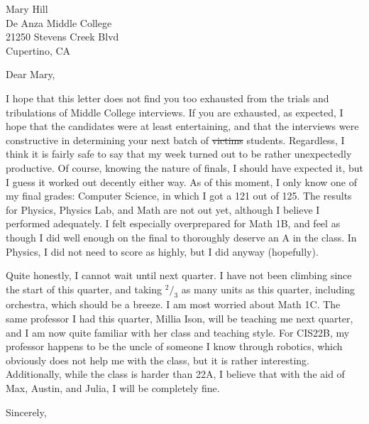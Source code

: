 \documentclass[a4paper]{letter}
\begin{document}
\begin{letter}{Mary Hill \\ De Anza Middle College \\ 21250 Stevens Creek Blvd \\ Cupertino, CA}
    \opening{Dear Mary,}
    I hope that this letter does not find you too exhausted from the trials and tribulations of Middle College interviews. If you are exhausted, as expected, I hope that the candidates were at least entertaining, and that the interviews were constructive in determining your next batch of \sout{victims} students. Regardless, I think it is fairly safe to say that my week turned out to be rather unexpectedly productive. Of course, knowing the nature of finals, I should have expected it, but I guess it worked out decently either way. As of this moment, I only know one of my final grades: Computer Science, in which I got a 121 out of 125. The results for Physics, Physics Lab, and Math are not out yet, although I believe I performed adequately. I felt especially overprepared for Math 1B, and feel as though I did well enough on the final to thoroughly deserve an A in the class. In Physics, I did not need to score as highly, but I did anyway (hopefully).
    

    Quite honestly, I cannot wait until next quarter. I have not been climbing since the start of this quarter, and taking $^2/_3$ as many units as this quarter, including orchestra, which should be a breeze. I am most worried about Math 1C. The same professor I had this quarter, Millia Ison, will be teaching me next quarter, and I am now quite familiar with her class and teaching style. For CIS22B, my professor happens to be the uncle of someone I know through robotics, which obviously does not help me with the class, but it is rather interesting. Additionally, while the class is harder than 22A, I believe that with the aid of Max, Austin, and Julia, I will be completely fine.

    \closing{Sincerely,}
\end{letter}
\end{document}
